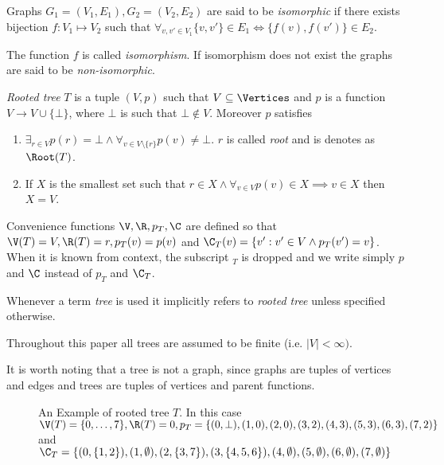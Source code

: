 \begin{defi}
    Graphs $G_1 = (V_1, E_1), G_2 = (V_2, E_2)$ are said to be \emph{isomorphic} if there exists bijection $f\colon V_1 \mapsto V_2$ such that $\forall_{v, v' \in V_1} \{v,v'\} \in E_1 \iff \{f(v), f(v')\} \in E_2$.

    The function $f$ is called \emph{isomorphism}. If isomorphism does not exist the graphs are said to be \emph{non-isomorphic}.
\end{defi}

\begin{defi}
    \emph{Rooted tree} $T$ is a tuple $(V, p)$ such that $V \subseteq \Vertices$ and $p$ is a function $V \to V \cup \{\bot\}$, where $\bot$ is such that $\bot \not\in V$. Moreover $p$ satisfies
    \begin{enumerate}
        \item $\exists_{r \in V} p(r) = \bot \land \forall_{v \in V\setminus\{r\}} p(v) \neq \bot$. $r$ is called \emph{root} and is denotes as $\Root(T)$.
        \item If $X$ is the smallest set such that $r \in X \land \forall_{v \in V} p(v) \in X \implies v \in X$ then $X = V$.
    \end{enumerate}
    Convenience functions $\V, \R, p_T, \C$ are defined so that $\V(T) = V, \R(T) = r, p_T(v) = p(v)$ and $\C_T(v) = \{v' : v' \in V \land p_T(v') = v\}$. When it is known from context, the subscript $_T$ is dropped and we write simply $p$ and $\C$ instead of $p_T$ and $\C_T$.

    Whenever a term \emph{tree} is used it implicitly refers to \emph{rooted tree} unless specified otherwise.

    Throughout this paper all trees are assumed to be finite (i.e. $|V| < \infty)$.

    It is worth noting that a tree is not a graph, since graphs are tuples of vertices and edges and trees are tuples of vertices and parent functions.

    \begin{figure}[h]
        \centering
        \caption{An Example of rooted tree $T$. In this case $\V(T) = \{0,\ldots,7\}, \R(T) = 0, p_T = \{(0, \bot), (1,0), (2,0), (3,2), (4,3), (5,3), (6,3), (7,2)\}$ and $\C_T = \{(0,\{1,2\}), (1,\emptyset), (2,\{3,7\}), (3,\{4,5,6\}), (4, \emptyset), (5, \emptyset), (6, \emptyset), (7, \emptyset)\}$}
    \end{figure}
\end{defi}

